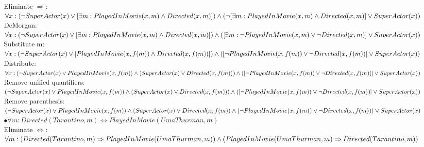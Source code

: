 \documentclass[paper=a4, fontsize=11pt]{scrartcl} %
\numberwithin{equation}{section} %
\numberwithin{figure}{section} %
\numberwithin{table}{section} %
\begin{document}
\begin{enumerate}
\begin{enumerate}
			Eliminate $\Rightarrow$:\\
			$\forall x: (\neg SuperActor(x) \vee [\exists m: PlayedInMovie(x,m) \wedge Directed(x,m)]) \wedge \\
			(\neg [\exists m: PlayedInMovie(x,m) \wedge Directed(x,m)] \vee SuperActor(x))$\\
			
			DeMorgan:\\
			$\forall x: (\neg SuperActor(x) \vee [\exists m: PlayedInMovie(x,m) \wedge Directed(x,m)]) \wedge \\
			([\exists m: \neg PlayedInMovie(x,m) \vee \neg Directed(x,m)] \vee SuperActor(x))$\\
			
			Substitute m:\\
			$\forall x: (\neg SuperActor(x) \vee [PlayedInMovie(x,f(m)) \wedge Directed(x,f(m))]) \wedge \\
			 ([\neg PlayedInMovie(x,f(m)) \vee \neg Directed(x,f(m))] \vee SuperActor(x))$\\
			
			Distribute:\\
			$\forall x: (\neg SuperActor(x) \vee PlayedInMovie(x,f(m)) \wedge (SuperActor(x) \vee Directed(x,f(m))) \wedge \\
			([\neg PlayedInMovie(x,f(m)) \vee \neg Directed(x,f(m))] \vee SuperActor(x))$\\
			
			Remove unified quantifiers:\\
			$(\neg SuperActor(x) \vee PlayedInMovie(x,f(m)) \wedge (SuperActor(x) \vee Directed(x,f(m))) \wedge \\
			([\neg PlayedInMovie(x,f(m)) \vee \neg Directed(x,f(m))] \vee SuperActor(x))$\\
			
			Remove parenthesis:\\
			$(\neg SuperActor(x) \vee PlayedInMovie(x,f(m)) \wedge (SuperActor(x) \vee Directed(x,f(m)) \wedge \\
			(\neg PlayedInMovie(x,f(m)) \vee \neg Directed(x,f(m))) \vee SuperActor(x)$\\


			$\bullet \forall m: Directed(Tarantino,m) \Leftrightarrow PlayedInMovie(UmaThurman,m)$\\
			
			Eliminate $\Leftrightarrow$:\\
			$\forall m: (Directed(Tarantino,m) \Rightarrow PlayedInMovie(UmaThurman,m)) \wedge \\
			(PlayedInMovie(UmaThurman,m) \Rightarrow Directed(Tarantino,m))$\\
			

\end{enumerate}
\end{enumerate}
\end{document}
